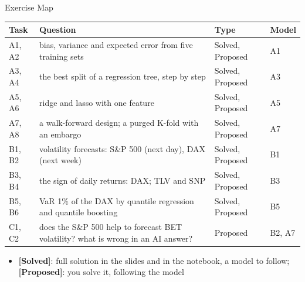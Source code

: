 \begin{frame}{Exercise Map}
\itemsize{\small}
\begin{center}
\footnotesize
\begin{tabular}{>{\raggedright\arraybackslash}p{1.1cm}>{\raggedright\arraybackslash}p{7.5cm}>{\raggedright\arraybackslash}p{1.9cm}>{\raggedright\arraybackslash}p{1.4cm}}
\toprule
\textbf{Task} & \textbf{Question} & \textbf{Type} & \textbf{Model} \\
\midrule
A1, A2 & bias, variance and expected error from five training sets & Solved, Proposed & A1 \\
A3, A4 & the best split of a regression tree, step by step & Solved, Proposed & A3 \\
A5, A6 & ridge and lasso with one feature & Solved, Proposed & A5 \\
A7, A8 & a walk-forward design; a purged K-fold with an embargo & Solved, Proposed & A7 \\
B1, B2 & volatility forecasts: S\&P 500 (next day), DAX (next week) & Solved, Proposed & B1 \\
B3, B4 & the sign of daily returns: DAX; TLV and SNP & Solved, Proposed & B3 \\
B5, B6 & VaR 1\% of the DAX by quantile regression and quantile boosting & Solved, Proposed & B5 \\
C1, C2 & does the S\&P 500 help to forecast BET volatility? what is wrong in an AI answer? & Proposed & B2, A7 \\
\bottomrule
\end{tabular}
\end{center}
\begin{itemize}
    \item \textbf{[Solved]}: full solution in the slides and in the notebook, a model to follow; \textbf{[Proposed]}: you solve it, following the model
\end{itemize}
\end{frame}

